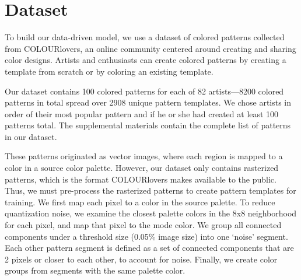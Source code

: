 \section{Dataset}
\label{sec:dataset}

To build our data-driven model, we use a dataset of colored patterns collected from COLOURlovers, an online community centered around creating and sharing color designs. Artists and enthusiasts can create colored patterns by creating a template from scratch or by coloring an existing template. 

Our dataset contains 100 colored patterns for each of 82 artists---8200 colored patterns in total spread over 2908 unique pattern templates. We chose artists in order of their most popular pattern and if he or she had created at least 100 patterns total. The supplemental materials contain the complete list of patterns in our dataset.

These patterns originated as vector images, where each region is mapped to a color in a source color palette. However, our dataset only contains rasterized patterns, which is the format COLOURlovers makes available to the public. Thus, we must pre-process the rasterized patterns to create pattern templates for training. We first map each pixel to a color in the source palette. To reduce quantization noise, we examine the closest palette colors in the 8x8 neighborhood for each pixel, and map that pixel to the mode color. We group all connected components under a threshold size (0.05\% image size) into one `noise' segment. Each other pattern segment is defined as a set of connected components that are 2 pixels or closer to each other, to account for noise. Finally, we create color groups from segments with the same palette color.